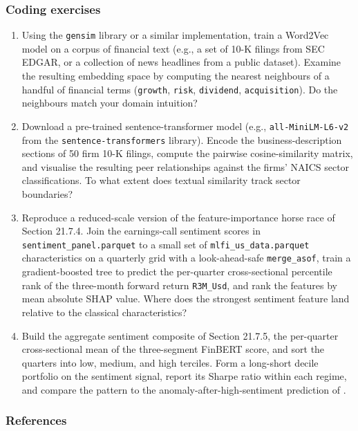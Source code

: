 \subsubsection{Coding exercises}

\begin{enumerate}
\item Using the \texttt{gensim} library or a similar implementation, train a Word2Vec
model on a corpus of financial text (e.g., a set of 10-K filings from
SEC EDGAR, or a collection of news headlines from a public dataset).
Examine the resulting embedding space by computing the nearest neighbours
of a handful of financial terms (\texttt{growth}, \texttt{risk}, \texttt{dividend},
\texttt{acquisition}). Do the neighbours match your domain intuition?
\item Download a pre-trained sentence-transformer model (e.g., \texttt{all-MiniLM-L6-v2}
from the \texttt{sentence-transformers} library). Encode the business-description
sections of 50 firm 10-K filings, compute the pairwise cosine-similarity
matrix, and visualise the resulting peer relationships against the firms'
NAICS sector classifications. To what extent does textual similarity track
sector boundaries?
\item Reproduce a reduced-scale version of the feature-importance horse race of
Section 21.7.4. Join the earnings-call sentiment scores in
\texttt{sentiment\_panel.parquet} to a small set of \texttt{mlfi\_us\_data.parquet}
characteristics on a quarterly grid with a look-ahead-safe \texttt{merge\_asof},
train a gradient-boosted tree to predict the per-quarter cross-sectional
percentile rank of the three-month forward return \texttt{R3M\_Usd}, and rank the
features by mean absolute SHAP value. Where does the strongest sentiment
feature land relative to the classical characteristics?
\item Build the aggregate sentiment composite of Section 21.7.5, the per-quarter
cross-sectional mean of the three-segment FinBERT score, and sort the
quarters into low, medium, and high terciles. Form a long-short decile
portfolio on the sentiment signal, report its Sharpe ratio within each
regime, and compare the pattern to the anomaly-after-high-sentiment
prediction of \cite{stambaugh2012short}.
\end{enumerate}

\subsubsection{References}